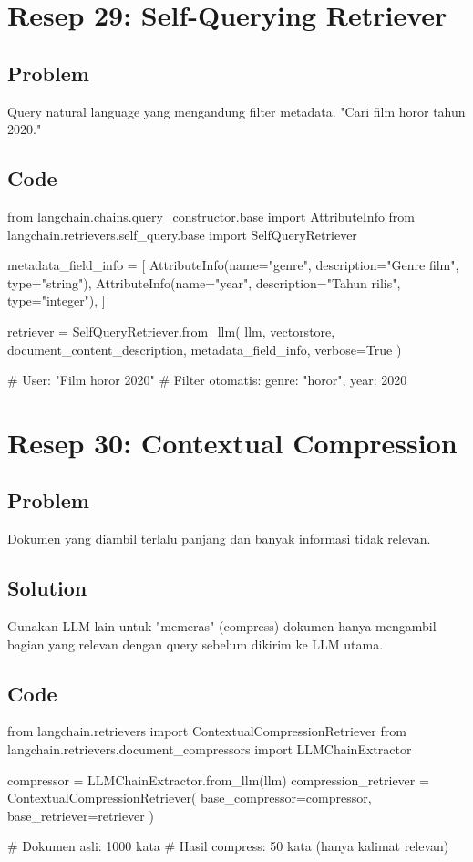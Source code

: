 \newpage

\section{Resep 29: Self-Querying Retriever}

\subsection*{Problem}
Query natural language yang mengandung filter metadata. "Cari film horor tahun 2020."

\subsection*{Code}
\begin{codeblock}[language=Python]
from langchain.chains.query_constructor.base import AttributeInfo
from langchain.retrievers.self_query.base import SelfQueryRetriever

metadata_field_info = [
    AttributeInfo(name="genre", description="Genre film", type="string"),
    AttributeInfo(name="year", description="Tahun rilis", type="integer"),
]

retriever = SelfQueryRetriever.from_llm(
    llm, vectorstore, document_content_description, metadata_field_info, verbose=True
)

# User: "Film horor 2020"
# Filter otomatis: { genre: "horor", year: 2020 }
\end{codeblock}

\newpage

\section{Resep 30: Contextual Compression}

\subsection*{Problem}
Dokumen yang diambil terlalu panjang dan banyak informasi tidak relevan.

\subsection*{Solution}
Gunakan LLM lain untuk "memeras" (compress) dokumen hanya mengambil bagian yang relevan dengan query sebelum dikirim ke LLM utama.

\subsection*{Code}
\begin{codeblock}[language=Python]
from langchain.retrievers import ContextualCompressionRetriever
from langchain.retrievers.document_compressors import LLMChainExtractor

compressor = LLMChainExtractor.from_llm(llm)
compression_retriever = ContextualCompressionRetriever(
    base_compressor=compressor,
    base_retriever=retriever
)

# Dokumen asli: 1000 kata
# Hasil compress: 50 kata (hanya kalimat relevan)
\end{codeblock}

